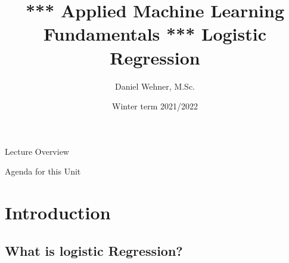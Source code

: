 


\title[Principal Component Analysis]{*** Applied Machine Learning Fundamentals *** Logistic Regression}
\author{Daniel Wehner, M.Sc.}
\date{Winter term 2021/2022}




\maketitlepage


\begin{frame}{Lecture Overview}{}
\end{frame}


\begin{frame}{Agenda for this Unit}
	\begin{multicols}{2}
		\tableofcontents
	\end{multicols}
\end{frame}


\section{Introduction}

\subsection{What is logistic Regression?}

